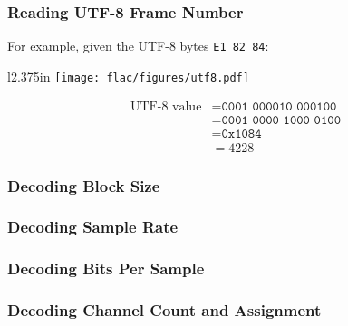 \clearpage

\subsubsection{Reading UTF-8 Frame Number}
\label{flac:read_utf8}

For example, given the UTF-8 bytes \texttt{E1 82 84}:
\par
\begin{wrapfigure}[5]{l}{2.375in}
\texttt{[image: flac/figures/utf8.pdf]}
\end{wrapfigure}
\begin{align*}
\text{UTF-8 value} &= \texttt{0001 000010 000100} \\
&= \texttt{0001 0000 1000 0100} \\
&= \texttt{0x1084} \\
&= 4228
\end{align*}

\clearpage

\subsubsection{Decoding Block Size}
\label{flac:decode_block_size}
{

}

\subsubsection{Decoding Sample Rate}
\label{flac:decode_sample_rate}
{

}

\clearpage

\subsubsection{Decoding Bits Per Sample}
\label{flac:decode_bps}
{

}

\subsubsection{Decoding Channel Count and Assignment}
\label{flac:decode_channels}
{

}

\clearpage

